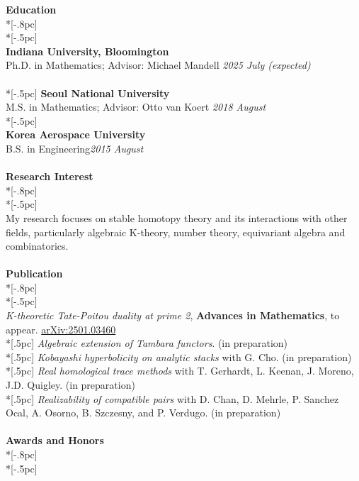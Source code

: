 \documentclass{article}
\begin{document}
{\Large \bf Education} \\*[-.8pc]
\underline{\hspace{6.5in}} \\*[-.5pc]
\\
{\bf Indiana University, Bloomington}\\ 
{Ph.D. in Mathematics; Advisor: Michael Mandell} \hfill {\it  2025 July (expected)} \\
\\*[-.5pc]
{\bf Seoul National University} \\ 
{M.S. in Mathematics; Advisor: Otto van Koert} \hfill{\it 2018 August} \\*[-.5pc]
\\
{\bf Korea Aerospace University} \\
{B.S. in Engineering}\hfill{\it 2015 August}\\
\\
{\Large \bf Research Interest} \\*[-.8pc]
\underline{\hspace{6.5in}} \\*[-.5pc]
\\
My research focuses on stable homotopy theory and its interactions with other fields, particularly algebraic K-theory, number theory, equivariant algebra and combinatorics.
\\
\\
{\Large \bf Publication} \\*[-.8pc]
\underline{\hspace{6.5in}} \\*[-.5pc]
\\
{\it K-theoretic Tate-Poitou duality at prime 2}, {\bf Advances in Mathematics}, to appear. \href{https://arxiv.org/abs/2501.03460}{arXiv:2501.03460}\\*[.5pc]
{\it Algebraic extension of Tambara functors}. (in preparation)\\*[.5pc]
{\it Kobayashi hyperbolicity on analytic stacks} with G. Cho. (in preparation)\\*[.5pc]
{\it Real homological trace methods} with T. Gerhardt, L. Keenan, J. Moreno, J.D. Quigley. (in preparation)\\*[.5pc]
{\it Realizability of compatible pairs} with D. Chan, D. Mehrle, P. Sanchez Ocal, A. Osorno, B. Szczesny, and P. Verdugo. (in preparation)\\
\\ 
{\Large \bf Awards and Honors} \\*[-.8pc]
\underline{\hspace{6.5in}} \\*[-.5pc]
\end{document}
